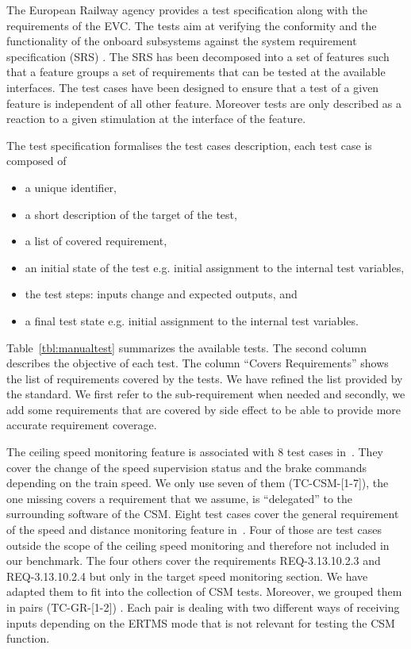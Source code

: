 The European Railway agency provides a test specification
\cite{ETCS-Subset076} along with the requirements of the EVC.  The
tests aim at verifying the conformity and the functionality of the onboard 
subsystems against the system requirement specification (SRS)
\cite{ETCS}.  The SRS has been decomposed into a set of features such
that a feature groups a set of requirements that can be tested at the
available interfaces. The test cases have been designed to ensure that
a test of a given feature is independent of all other
feature. Moreover tests are only described as a reaction to a given
stimulation at the interface of the feature.

The test specification formalises the test cases
description, each test case is composed of
\begin{itemize}
\item  a unique identifier,
\item  a short description of the target of the test,
\item  a list of covered requirement,
\item an initial state of the test e.g. initial assignment to the
internal test variables,
\item the test  steps:  inputs change and expected outputs, and
\item a final test state e.g. initial assignment to the
internal test variables.
\end{itemize}


Table~\ref{tbl:manualtest} summarizes the available
tests. The second column describes the objective of each test.  The
column ``Covers Requirements'' shows the list of requirements covered
by the tests. We have refined the list provided by the standard. We
first refer to the sub-requirement when needed and secondly, we add
some requirements that are covered by side effect  to be able to
provide more accurate requirement coverage.

The ceiling speed monitoring feature is associated with 8 test cases
in~\cite{ETCS-Subset076}.  They cover the change of the speed
supervision status and the brake commands depending on  the train
speed. We only use seven of them (TC-CSM-[1-7]), the one missing
covers a requirement that we assume, is “delegated” to the surrounding software
of the CSM.
Eight test cases cover the general requirement of the speed and
distance monitoring feature in~\cite{ETCS-Subset076}. Four of those
are test cases outside the scope of the ceiling speed monitoring and
therefore not included in our benchmark.
The four others cover the requirements {\sf REQ-3.13.10.2.3} and
{\sf REQ-3.13.10.2.4} but only in the target speed monitoring section. We
have adapted them to fit into the collection of CSM tests. Moreover,
we grouped them in pairs (TC-GR-[1-2]) . Each pair is dealing with two different ways
of receiving inputs depending on the  ERTMS mode that is not
relevant for testing the CSM function.


